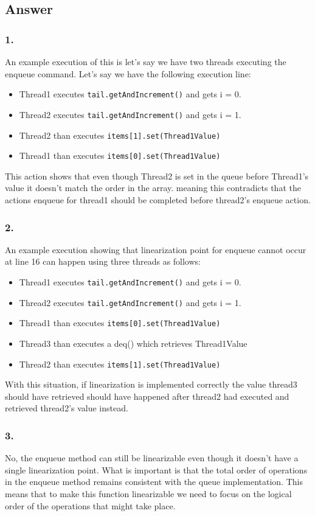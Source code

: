 \documentclass{article}
\begin{document}
\subsection*{Answer}
\subsubsection*{1.}
An example execution of this is let's say we have two threads executing the enqueue command. Let's say we have the following execution line:

\begin{itemize}
    \item Thread1 executes \texttt{tail.getAndIncrement()} and gets i = 0.
    \item Thread2 executes \texttt{tail.getAndIncrement()} and gets i = 1.
    \item Thread2 than executes \texttt{items[1].set(Thread1Value)}
    \item Thread1 than executes \texttt{items[0].set(Thread1Value)}
\end{itemize}

This action shows that even though Thread2 is set in the queue before Thread1's value it doesn't match the order in the array. meaning this contradicts that the actions enqueue for thread1 should be completed before thread2's enqueue action.


\subsubsection*{2.}
An example execution showing that linearization point for enqueue cannot occur at line 16 can happen using three threads as follows:


\begin{itemize}
    \item Thread1 executes \texttt{tail.getAndIncrement()} and gets i = 0.
    \item Thread2 executes \texttt{tail.getAndIncrement()} and gets i = 1.
    \item Thread1 than executes \texttt{items[0].set(Thread1Value)}
    \item Thread3 than executes a deq() which retrieves Thread1Value
    \item Thread2 than executes \texttt{items[1].set(Thread1Value)}
\end{itemize}

With this situation, if linearization is implemented correctly the value thread3 should have retrieved should have happened after thread2 had executed and retrieved thread2's value instead.


\subsubsection*{3.}
No, the enqueue method can still be linearizable even though it doesn't have a single linearization point. What is important is that the total order of operations in the enqueue method remains consistent with the queue implementation. This means that to make this function linearizable we need to focus on the logical order of the operations that might take place.



\newpage
\printbibliography
\end{document}
